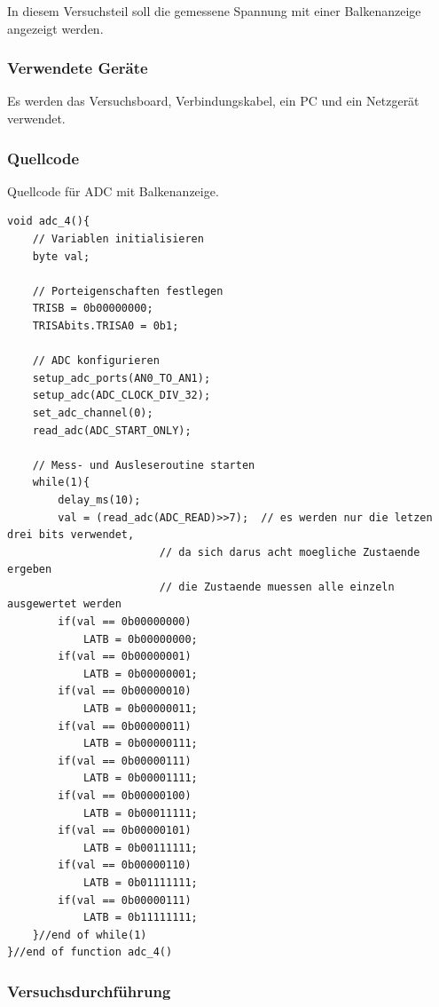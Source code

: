 \documentclass[12pt,a4paper]{article}
\begin{document}
In diesem Versuchsteil soll die gemessene Spannung mit einer Balkenanzeige angezeigt werden.

\subsubsection*{Verwendete Geräte}

Es werden das Versuchsboard, Verbindungskabel, ein PC und ein Netzgerät verwendet.

\subsubsection*{Quellcode}

Quellcode für ADC mit Balkenanzeige.

\lstset{language=C, basicstyle=\tiny}
\begin{lstlisting}[caption = {ADC mit Balkenanzeige}, label=lst:g_16,captionpos=b]
void adc_4(){
	// Variablen initialisieren
	byte val;
	
	// Porteigenschaften festlegen
	TRISB = 0b00000000;
	TRISAbits.TRISA0 = 0b1;
	
	// ADC konfigurieren
	setup_adc_ports(AN0_TO_AN1);
	setup_adc(ADC_CLOCK_DIV_32);
	set_adc_channel(0);
	read_adc(ADC_START_ONLY);
	
	// Mess- und Ausleseroutine starten
	while(1){
		delay_ms(10);
		val = (read_adc(ADC_READ)>>7);	// es werden nur die letzen drei bits verwendet,
						// da sich darus acht moegliche Zustaende ergeben
						// die Zustaende muessen alle einzeln ausgewertet werden
		if(val == 0b00000000)
			LATB = 0b00000000;		
		if(val == 0b00000001)
			LATB = 0b00000001;
		if(val == 0b00000010)
			LATB = 0b00000011;
		if(val == 0b00000011)
			LATB = 0b00000111;		
		if(val == 0b00000111)
			LATB = 0b00001111;
		if(val == 0b00000100)
			LATB = 0b00011111;
		if(val == 0b00000101)
			LATB = 0b00111111;
		if(val == 0b00000110)
			LATB = 0b01111111;		
		if(val == 0b00000111)
			LATB = 0b11111111;					
	}//end of while(1)
}//end of function adc_4()
\end{lstlisting}

\subsubsection*{Versuchsdurchführung}
\end{document}
